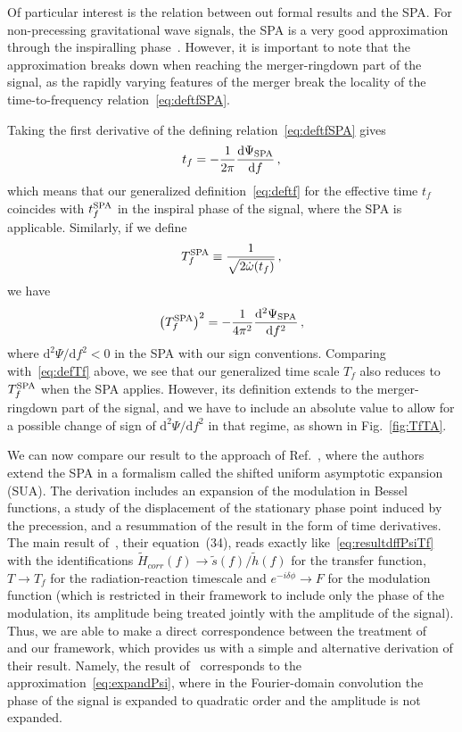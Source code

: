 \documentclass[aps,showpacs,%
prd,superscriptaddress,nofootinbib]{revtex4}
\newcommand{\be}{\begin{equation}}
\newcommand{\ee}{\end{equation}}
\newcommand\ud{{\mathrm{d}}}
\newcommand{\Tf}{T_{f}}
\begin{document}
Of particular interest is the relation between out formal results and the SPA. For non-precessing gravitational wave signals, the SPA is a very good approximation through the inspiralling phase~\cite{Droz+99}. However, it is important to note that the approximation breaks down when reaching the merger-ringdown part of the signal, as the rapidly varying features of the merger break the locality of the time-to-frequency relation~\eqref{eq:deftfSPA}.  

Taking the first derivative of the defining relation~\eqref{eq:deftfSPA} gives
\be
	t_{f} = -\frac{1}{2\pi} \frac{\ud \Psi_{\rm SPA}}{\ud f} \,,
\ee
which means that our generalized definition~\eqref{eq:deftf} for the effective time $t_{f}$ coincides with $t_{f}^{\rm SPA}$ in the inspiral phase of the signal, where the SPA is applicable. Similarly, if we define
\be
	T_{f}^{\rm SPA} \equiv \frac{1}{\sqrt{2\dot{\omega}(t_{f})}} \,,
\ee
we have
\be
	\left(T_{f}^{\rm SPA} \right)^{2} = -\frac{1}{4\pi^{2}}  \frac{\ud^{2} \Psi_{\rm SPA}}{\ud f^{2}} \,,
\ee
where $\ud^{2}\Psi/\ud f^{2} < 0$ in the SPA with our sign conventions. Comparing with~\eqref{eq:defTf} above, we see that our generalized time scale $\Tf$ also reduces to $T_{f}^{\rm SPA}$ when the SPA applies. However, its definition extends to the merger-ringdown part of the signal, and we have to include an absolute value to allow for a possible change of sign of $\ud^{2}\Psi/\ud f^{2}$ in that regime, as shown in Fig.~\ref{fig:TfTA}.

We can now compare our result to the approach of Ref.~\cite{KCY14}, where the authors extend the SPA in a formalism called the shifted uniform asymptotic expansion (SUA). The derivation includes an expansion of the modulation in Bessel functions, a study of the displacement of the stationary phase point induced by the precession, and a resummation of the result in the form of time derivatives. The main result of~\cite{KCY14}, their equation~(34), reads exactly like~\eqref{eq:resultdffPsiTf} with the identifications $\tilde{H}_{corr}(f)\rightarrow \tilde{s}(f)/\tilde{h}(f)$ for the transfer function, $T\rightarrow \Tf$ for the radiation-reaction timescale and $e^{-i\delta\phi} \rightarrow F$ for the modulation function (which is restricted in their framework to include only the phase of the modulation, its amplitude being treated jointly with the amplitude of the signal). Thus, we are able to make a direct correspondence between the treatment of~\cite{KCY14} and our framework, which provides us with a simple and alternative derivation of their result. Namely, the result of~\cite{KCY14} corresponds to the approximation~\eqref{eq:expandPsi}, where in the Fourier-domain convolution the phase of the signal is expanded to quadratic order and the amplitude is not expanded.
\end{document}
